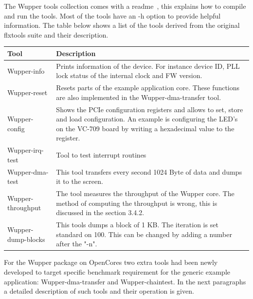 The Wupper tools collection comes with a readme~\cite{wupperreadme}, this explains how to compile and run the tools. Most of the tools have an -h option to provide helpful information. The table below shows a list of the tools derived from the original flxtools suite and their description.

\begin{center}
	\begin{tabular}{ | l || p{10cm} |}
		\hline
		Tool & Description                       \\ \hline

		Wupper-info
		&  Prints information of the device. For instance device ID, PLL lock status of the internal clock and FW version.
		\\ \hline
		
		Wupper-reset
		&  Resets parts of the example application core. These functions are also implemented in the Wupper-dma-transfer tool.
		\\ \hline
				
		
	    Wupper-config
		& Shows the PCIe configuration registers and allows to set, store and load configuration. An example is configuring the LED's on the VC-709 board by writing a hexadecimal value to the register.
                                     \\ \hline
  		Wupper-irq-test
  		&  Tool to test interrupt routines
  		\\ \hline
		
		Wupper-dma-test
		& This tool transfers every second 1024 Byte of data and dumps it to the screen.
	                                           \\ \hline
	
   		Wupper-throughput
   		&  The tool measures the throughput of the Wupper core. The method of computing the throughput is wrong, this is discussed in the section 3.4.2.
   		\\ \hline
	    		                                       
		
		Wupper-dump-blocks
		&  This tools dumps a block of 1 KB. The iteration is set standard on 100. This can be changed by adding a number after the "-n".
		                                          \\ \hline

	\end{tabular}
\end{center}

For the Wupper package on OpenCores two extra tools had been newly developed to target specific benchmark requirement for the generic example application: Wupper-dma-transfer and Wupper-chaintest. In the next paragraphs a detailed description of such tools and their operation is given.

